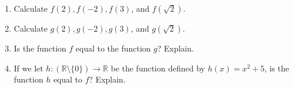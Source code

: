 \documentclass[letterpaper,12pt]{article}
\newcommand{\R}{\mathbb{R}}
\begin{document}
\begin{enumerate}
\begin{enumerate}
 \item Calculate $f(2), f(-2), f(3)$, and $f(\sqrt{2})$.
 \item Calculate $g(2), g(-2), g(3)$, and $g(\sqrt{2})$.
 \item Is the function $f$ equal to the function $g$? Explain.
 \item If we let $h:(\R\setminus \{0\})\to \R$ be the function defined by $h(x)=x^2+5$, is the function $h$ equal to $f$? Explain.
\end{enumerate}






\end{enumerate}
\end{document}
